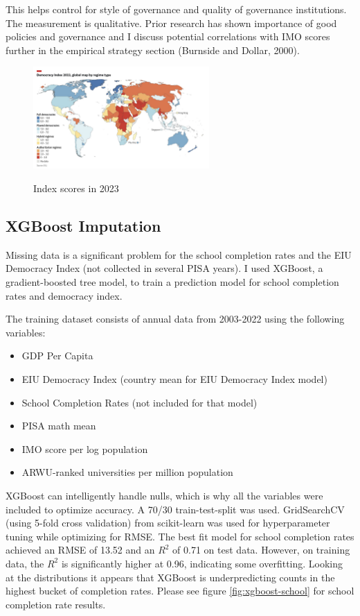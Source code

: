 \documentclass[11pt]{article}
\begin{document}
This helps control for style of governance and quality of governance institutions. The measurement is qualitative. Prior research has shown importance of good policies and governance and I discuss potential correlations with IMO scores further in the empirical strategy section (Burnside and Dollar, 2000).

\begin{figure}[H]
    \caption{Index scores in 2023}
    \centering
    \includegraphics[width=0.6\textwidth]{../charts/eiu_2023.jpg}
    \label{fig:eiu}
\end{figure}
\subsection{XGBoost Imputation}
Missing data is a significant problem for the school completion rates and the EIU Democracy Index (not collected in several PISA years). I used XGBoost, a gradient-boosted tree model, to train a prediction model for school completion rates and democracy index.

The training dataset consists of annual data from 2003-2022 using the following variables:
\begin{itemize}
    \item GDP Per Capita
    \item EIU Democracy Index (country mean for EIU Democracy Index model)
    \item School Completion Rates (not included for that model)
    \item PISA math mean
    \item IMO score per log population
    \item ARWU-ranked universities per million population
\end{itemize}

XGBoost can intelligently handle nulls, which is why all the variables were included to optimize accuracy. A 70/30 train-test-split was used. GridSearchCV (using 5-fold cross validation) from scikit-learn was used for hyperparameter tuning while optimizing for RMSE. The best fit model for school completion rates achieved an RMSE of 13.52 and an $R^2$ of 0.71 on test data. However, on training data, the $R^2$ is significantly higher at 0.96, indicating some overfitting. Looking at the distributions it appears that XGBoost is underpredicting counts in the highest bucket of completion rates. Please see figure \ref{fig:xgboost-school} for school completion rate results.
\end{document}
